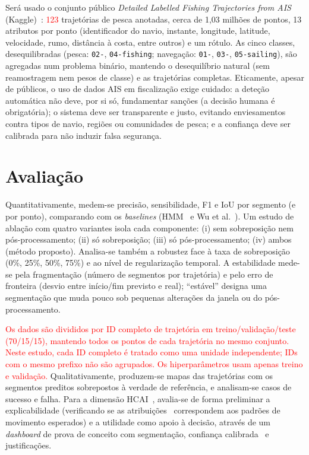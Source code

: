 \documentclass{article}
\begin{document}
Será usado o conjunto público \emph{Detailed Labelled Fishing Trajectories from AIS} (Kaggle)~\cite{kaggleAIS}: \textcolor{red}{123} trajetórias de pesca anotadas, cerca de 1,03 milhões de pontos, 13 atributos por ponto (identificador do navio, instante, longitude, latitude, velocidade, rumo, distância à costa, entre outros) e um rótulo. As cinco classes, desequilibradas (pesca: \texttt{02-}, \texttt{04-fishing}; navegação: \texttt{01-}, \texttt{03-}, \texttt{05-sailing}), são agregadas num problema binário, mantendo o desequilíbrio natural (sem reamostragem nem pesos de classe) e as trajetórias completas. Eticamente, apesar de públicos, o uso de dados AIS em fiscalização exige cuidado: a deteção automática não deve, por si só, fundamentar sanções (a decisão humana é obrigatória); o sistema deve ser transparente e justo, evitando enviesamentos contra tipos de navio, regiões ou comunidades de pesca; e a confiança deve ser calibrada para não induzir falsa segurança.

\section{Avaliação}
\label{sec:avaliacao}

Quantitativamente, medem-se precisão, sensibilidade, F1 e IoU por segmento (e por ponto), comparando com os \emph{baselines} (HMM~\cite{peel2011} e Wu et al.~). Um estudo de ablação com quatro variantes isola cada componente: (i) sem sobreposição nem pós-processamento; (ii) só sobreposição; (iii) só pós-processamento; (iv) ambos (método proposto). Analisa-se também a robustez face à taxa de sobreposição (0\%, 25\%, 50\%, 75\%) e ao nível de regularização temporal. A estabilidade mede-se pela fragmentação (número de segmentos por trajetória) e pelo erro de fronteira (desvio entre início/fim previsto e real); ``estável'' designa uma segmentação que muda pouco sob pequenas alterações da janela ou do pós-processamento.

\textcolor{red}{Os dados são divididos por ID completo de trajetória em treino/validação/teste (70/15/15), mantendo todos os pontos de cada trajetória no mesmo conjunto. Neste estudo, cada ID completo é tratado como uma unidade independente; IDs com o mesmo prefixo não são agrupados. Os hiperparâmetros usam apenas treino e validação.} Qualitativamente, produzem-se mapas das trajetórias com os segmentos preditos sobrepostos à verdade de referência, e analisam-se casos de sucesso e falha. Para a dimensão HCAI~\cite{shneiderman2020}, avalia-se de forma preliminar a explicabilidade (verificando se as atribuições~\cite{lundberg2017} correspondem aos padrões de movimento esperados) e a utilidade como apoio à decisão, através de um \emph{dashboard} de prova de conceito com segmentação, confiança calibrada~\cite{guo2017} e justificações.



\end{document}
